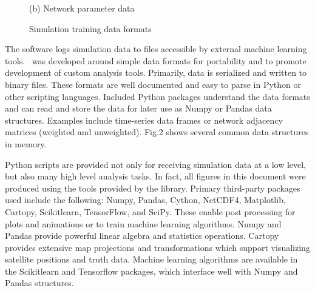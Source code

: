 \documentclass[conference]{IEEEtran}
\newcommand{\project}{{\sc{Collaborate}}~}
\begin{document}
\begin{figure}[t]
\begin{minipage}[b]{0.49\linewidth}
\begin{center}
      {\footnotesize(b) Network parameter data}
    \end{center}
  \end{minipage}
  \caption{Simulation training data formats}
  \label{fig:data}
\end{figure}

The software logs simulation data to files accessible by external machine
learning tools.  \project was developed around simple data formats for
portability and to promote development of custom analysis tools.  Primarily,
data is serialized and written to binary files.  These formats are well
documented and easy to parse in Python or other scripting languages.  Included
Python packages understand the data formats and can read and store the data for
later use as Numpy or Pandas data structures.  Examples include time-series data
frames or network adjacency matrices (weighted and unweighted).  Fig.2
shows several common data structures in memory.

Python scripts are provided not only for receiving simulation data at a low
level, but also many high level analysis tasks.  In fact, all figures in this
document were produced using the tools provided by the library.  Primary
third-party packages used include the following: Numpy, Pandas, Cython, NetCDF4,
Matplotlib, Cartopy, Scikitlearn, TensorFlow, and SciPy.  These enable post
processing for plots and animations or to train machine learning algorithms.
Numpy and Pandas provide powerful linear algebra and statistics operations.
Cartopy provides extensive map projections and transformations which support
visualizing satellite positions and truth data.  Machine learning algorithms are
available in the Scikitlearn and Tensorflow packages, which interface well with
Numpy and Pandas structures.
\end{document}
